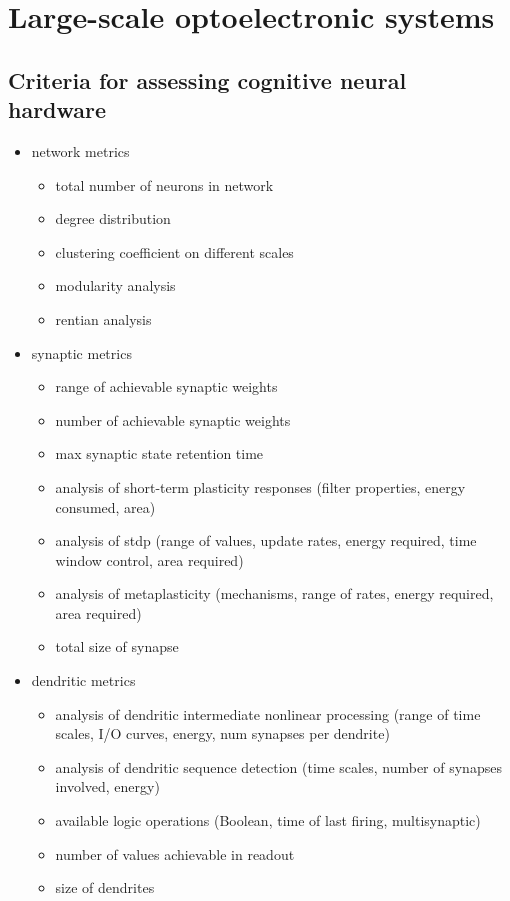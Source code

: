 \documentclass[twocolumn]{article}
\begin{document}
\section{\label{sec:scaling}Large-scale optoelectronic systems}

\subsection{Criteria for assessing cognitive neural hardware}


\begin{itemize}

\item network metrics
\begin{itemize}
\item total number of neurons in network
\item degree distribution
\item clustering coefficient on different scales
\item modularity analysis
\item rentian analysis
\end{itemize}

\item synaptic metrics
\begin{itemize}
\item range of achievable synaptic weights
\item number of achievable synaptic weights
\item max synaptic state retention time
\item analysis of short-term plasticity responses (filter properties, energy consumed, area)
\item analysis of stdp (range of values, update rates, energy required, time window control, area required)
\item analysis of metaplasticity (mechanisms, range of rates, energy required, area required)
\item total size of synapse
\end{itemize}

\item dendritic metrics
\begin{itemize}
\item analysis of dendritic intermediate nonlinear processing (range of time scales, I/O curves, energy, num synapses per dendrite)
\item analysis of dendritic sequence detection (time scales, number of synapses involved, energy)
\item available logic operations (Boolean, time of last firing, multisynaptic)
\item number of values achievable in readout
\item size of dendrites
\end{itemize}


\end{itemize}
\end{document}
